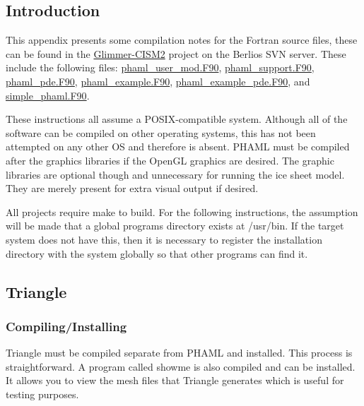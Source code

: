 \subsection{Introduction}
This appendix presents some compilation notes for the Fortran source files, these can be found in the \href{http://developer.berlios.de/projects/glimmer-cism/}{Glimmer-CISM2} project on the Berlios SVN server.  These include the following files:
\href{http://svn.berlios.de/svnroot/repos/glimmer-cism/glimmer-cism2/libphaml/phaml\_user\_mod.F90}{phaml\_user\_mod.F90},
\href{http://svn.berlios.de/svnroot/repos/glimmer-cism/glimmer-cism2/libphaml/phaml\_support.F90}{phaml\_support.F90},
\href{http://svn.berlios.de/svnroot/repos/glimmer-cism/glimmer-cism2/libphaml/phaml\_pde.F90}{phaml\_pde.F90},
\href{http://svn.berlios.de/svnroot/repos/glimmer-cism/glimmer-cism2/libphaml/phaml\_example.F90}{phaml\_example.F90},
\href{http://svn.berlios.de/svnroot/repos/glimmer-cism/glimmer-cism2/libphaml/phaml\_example\_pde.F90}{phaml\_example\_pde.F90}, and 
\href{http://svn.berlios.de/svnroot/repos/glimmer-cism/glimmer-cism2/libphaml/simple\_phaml.F90}{simple\_phaml.F90}.

These instructions all assume a POSIX-compatible system.  Although all of the software can be compiled on other operating systems, this has not been attempted on any other OS and therefore is absent.  PHAML must be compiled after the graphics libraries if the OpenGL graphics are desired.  The graphic libraries are optional though and unnecessary for running the ice sheet model.  They are merely present for extra visual output if desired.


All projects require make to build.  For the following instructions, the assumption will be made that a global programs directory exists at /usr/bin.  If the target system does not have this, then it is necessary to register the installation directory with the system globally so that other programs can find it.
\subsection{Triangle}
\subsubsection{Compiling/Installing}
Triangle must be compiled separate from PHAML and installed.  This process is straightforward.  A program called showme is also compiled and can be installed.  It allows you to view the mesh files that Triangle generates which is useful for testing purposes.

